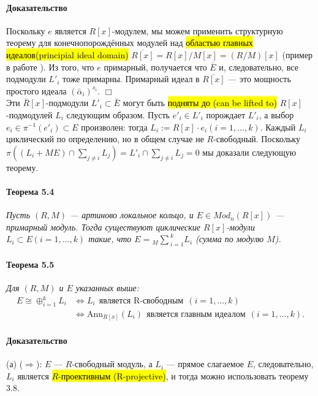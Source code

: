 \documentclass[a4paper,12pt]{article}
\newcommand{\dirsummod}[1]{{_{{#1}}\!\!\sum}}
\newcommand{\Ann}{\text{Ann}}
\begin{document}
\paragraph{Доказательство}

Поскольку $e$ является $R[x]$-модулем, мы можем применить структурную теорему для конечнопорождённых модулей над \hl{областью главных идеалов(principial ideal domain)} $\overline{R[x]} = R[x]/M[x] = (R/M)[x]$ (пример в работе \cite{bib3}). Из того, что $e$ примарный, получается что $\overline{E}$ и, следовательно, все подмодули $L'_i$ тоже примарны. Примарный идеал в $\overline{R[x]}$ --- это мощность простого идеала $(\bar{\alpha}_i)^{s_i}$. $\Box$ \\


Эти $\bar{R}[x]$-подмодули $L'_i \subset \bar{E}$ могут быть \hl{подняты до (can be lifted to)} $R[x]$-подмодулей $L_i$ следующим образом. Пусть $e'_i \in L'_i$ порождает $L'_i$, а выбор $e_i \in \pi ^{-1} (e'_i) \subset E $ произволен: тогда $L_i := R[x] \cdot e_i (i = 1, ..., k)$. Каждый $L_i$ циклический по определению, но в общем случае не $R$-свободный. Поскольку $\pi ((L_i + M E) \cap \sum_{j \ne i}L_j) = L'_i \cap \sum_{j \ne i} L_j = 0$ мы доказали следующую теорему.

\paragraph{Теорема 5.4}
{\itshape
Пусть $(R, M)$ --- артиново локальное кольцо, и $E \in Mod_n(R[x])$ --- примарный модуль. Тогда существуют циклические $R[x]$-модули $L_i \subset E (i = 1, ..., k)$ такие, что $E = \dirsummod{M}_{i = 1}^k L_i$ (сумма по модулю $M$).
}


\paragraph{Теорема 5.5}
{\itshape
Для $(R, M)$ и $E$ указанных выше:
$$
\begin{aligned}
E \cong \oplus_{i = 1}^{k} L_i &  \Leftrightarrow L_i ~~ \text{является R-свободным} ~~ (i = 1, ..., k) \\
&  \Leftrightarrow   \Ann_{R[x]}(L_i) ~~ \text{является главным идеалом} ~~ (i = 1, ..., k).
\end{aligned}
$$
}

\paragraph{Доказательство}
(а) ($\Rightarrow$): $E$ --- $R$-свободный модуль, а $L_i$  --- прямое слагаемое $E$, следовательно, $L_i$ является \hl{$R$-проективным (R-projective)}, и тогда можно использовать теорему 3.8.
\end{document}
